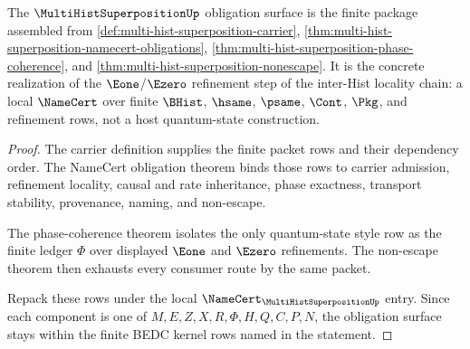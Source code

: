 \begin{theorem}
\label{thm:multi-hist-superposition-obligation-surface}
The $\MultiHistSuperpositionUp$ obligation surface is the finite package assembled from \autoref{def:multi-hist-superposition-carrier}, \autoref{thm:multi-hist-superposition-namecert-obligations}, \autoref{thm:multi-hist-superposition-phase-coherence}, and \autoref{thm:multi-hist-superposition-nonescape}. It is the concrete realization of the $\Eone$/$\Ezero$ refinement step of the inter-Hist locality chain: a local $\NameCert$ over finite $\BHist$, $\hsame$, $\psame$, $\Cont$, $\Pkg$, and refinement rows, not a host quantum-state construction.
\end{theorem}
\begin{proof}
The carrier definition supplies the finite packet rows and their dependency order. The NameCert obligation theorem binds those rows to carrier admission, refinement locality, causal and rate inheritance, phase exactness, transport stability, provenance, naming, and non-escape.

The phase-coherence theorem isolates the only quantum-state style row as the finite ledger $\Phi$ over displayed $\Eone$ and $\Ezero$ refinements. The non-escape theorem then exhausts every consumer route by the same packet.

Repack these rows under the local $\NameCert_{\MultiHistSuperpositionUp}$ entry. Since each component is one of $M,E,Z,X,R,\Phi,H,Q,C,P,N$, the obligation surface stays within the finite BEDC kernel rows named in the statement.
\end{proof}


\begin{closurestatus}{\MultiHistSuperpositionUp}
  \theoryclosure{\seedClosure}
  \formalstatus{\unformalizedV}
\end{closurestatus}
